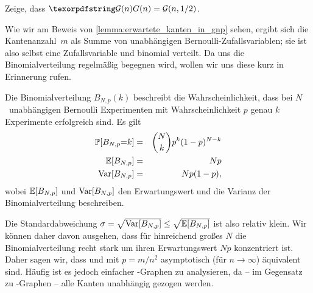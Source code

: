 \begin{exercise}
    Zeige, dass $\Gn = \mathcal G(n, 1/2)$.
\end{exercise}

\bigskip

Wie wir am Beweis von \cref{lemma:erwartete_kanten_in_gnp} sehen, ergibt sich die Kantenanzahl~$m$ als Summe von unabhängigen Bernoulli-Zufallsvariablen;
sie ist also selbst eine Zufallsvariable und binomial verteilt.
Da uns die Binomialverteilung regelmäßig begegnen wird, wollen wir uns diese kurz in Erinnerung rufen.
\begin{definition}
    Die  Binomialverteilung $B_{N, p}(k)$ beschreibt die Wahrscheinlichkeit, dass bei $N$~unabhängigen Bernoulli Experimenten mit Wahrscheinlichkeit $p$ genau $k$ Experimente erfolgreich sind.
    Es gilt 
    \begin{eqnarray*}
        \mathbb{P}\!\left[B_{N,p} {=} k\right] &=& \binom{N}{k} p^k (1-p)^{N-k} \\
        \mathbb{E}\!\left[B_{N,p}\right] &=& Np \\
        \operatorname{Var}\!\left[B_{N,p}\right] &=& Np(1-p),
    \end{eqnarray*}
    wobei $\mathbb{E}\!\left[B_{N,p}\right]$ und $\operatorname{Var}\!\left[B_{N,p}\right]$ den Erwartungswert und die Varianz der Binomialverteilung beschreiben.
\end{definition}

Die Standardabweichung $\sigma = \sqrt{\operatorname{Var}\!\left[B_{N,p}\right]} \le \sqrt{\mathbb{E}\!\left[B_{N,p}\right]}$ ist also relativ klein.
Wir können daher davon ausgehen, dass für hinreichend großes $N$ die Binomialverteilung recht stark um ihren Erwartungswert $Np$ konzentriert ist.
Daher sagen wir, dass \Gnm und \Gnp mit $p=m/n^2$ asymptotisch (\dh für $n \to \infty$) äquivalent sind.
Häufig ist es jedoch einfacher \Gnp-Graphen zu analysieren, da -- im Gegensatz zu \Gnm-Graphen -- alle Kanten unabhängig gezogen werden.

